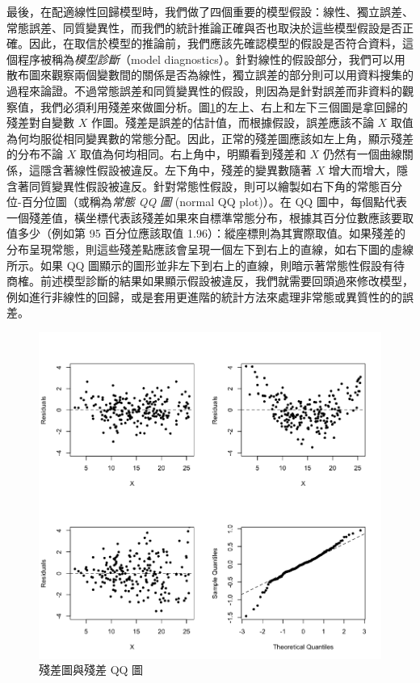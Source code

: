     最後，在配適線性回歸模型時，我們做了四個重要的模型假設：線性、獨立誤差、常態誤差、同質變異性，而我們的統計推論正確與否也取決於這些模型假設是否正確。因此，在取信於模型的推論前，我們應該先確認模型的假設是否符合資料，這個程序被稱為\textit{模型診斷}（model diagnostics）。針對線性的假設部分，我們可以用散布圖來觀察兩個變數間的關係是否為線性，獨立誤差的部分則可以用資料搜集的過程來論證。不過常態誤差和同質變異性的假設，則因為是針對誤差而非資料的觀察值，我們必須利用殘差來做圖分析。圖\ref{fig:diagnostics}的左上、右上和左下三個圖是拿回歸的殘差對自變數 $X$ 作圖。殘差是誤差的估計值，而根據假設，誤差應該不論 $X$ 取值為何均服從相同變異數的常態分配。因此，正常的殘差圖應該如左上角，顯示殘差的分布不論 $X$ 取值為何均相同。右上角中，明顯看到殘差和 $X$ 仍然有一個曲線關係，這隱含著線性假設被違反。左下角中，殘差的變異數隨著 $X$ 增大而增大，隱含著同質變異性假設被違反。針對常態性假設，則可以繪製如右下角的常態百分位-百分位圖（或稱為\textit{常態 QQ 圖} (normal QQ plot)）。在 QQ 圖中，每個點代表一個殘差值，橫坐標代表該殘差如果來自標準常態分布，根據其百分位數應該要取值多少（例如第 95 百分位應該取值 1.96）：縱座標則為其實際取值。如果殘差的分布呈現常態，則這些殘差點應該會呈現一個左下到右上的直線，如右下圖的虛線所示。如果 QQ 圖顯示的圖形並非左下到右上的直線，則暗示著常態性假設有待商榷。前述模型診斷的結果如果顯示假設被違反，我們就需要回頭過來修改模型，例如進行非線性的回歸，或是套用更進階的統計方法來處理非常態或異質性的的誤差。

    \begin{figure}[htbp]
        \centering
        \includegraphics[width=\textwidth]{figures/08-Correlation_linear_regression/diagnostics.png}
        \caption{殘差圖與殘差 QQ 圖}
        \label{fig:diagnostics}
    \end{figure}

